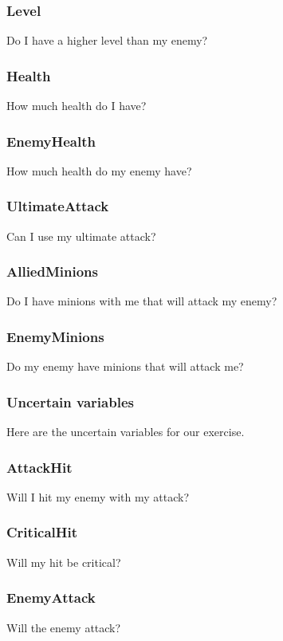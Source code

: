 \documentclass[titlepage]{article}
\begin{document}
\subsubsection*{Level}
Do I have a higher level than my enemy?

\subsubsection*{Health}
How much health do I have?

\subsubsection*{EnemyHealth}
How much health do my enemy have?

\subsubsection*{UltimateAttack}
Can I use my ultimate attack?

\subsubsection*{AlliedMinions}
Do I have minions with me that will attack my enemy?

\subsubsection*{EnemyMinions}
Do my enemy have minions that will attack me?



\subsubsection{Uncertain variables}
Here are the uncertain variables for our exercise. 

\subsubsection*{AttackHit}
Will I hit my enemy with my attack?

\subsubsection*{CriticalHit}
Will my hit be critical?

\subsubsection*{EnemyAttack}
Will the enemy attack?
\end{document}
